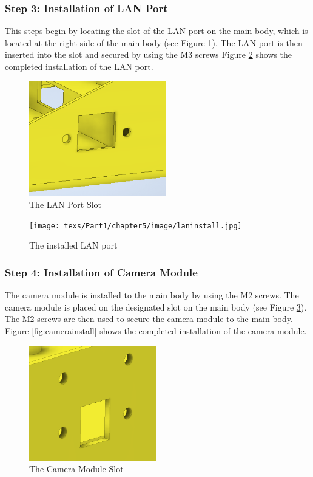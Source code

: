 \subsubsection{Step 3: Installation of LAN Port}

This steps begin by locating the slot of the LAN port on the main body, which is located at the right side of the main body (see Figure \ref{fig:lanslot}). The LAN port is then inserted into the slot and secured by using the M3 screws Figure \ref{fig:laninstall} shows the completed installation of the LAN port.

\begin{figure}
    \centering
    \includegraphics[height=5cm]{texs/Part1/chapter5/image/lanslot.png}
    \caption{The LAN Port Slot}
    \label{fig:lanslot}
\end{figure}

\begin{figure}
    \centering
    \texttt{[image: texs/Part1/chapter5/image/laninstall.jpg]}
    \caption{The installed LAN port}
    \label{fig:laninstall}
\end{figure}

\subsubsection{Step 4: Installation of Camera Module}

The camera module is installed to the main body by using the M2 screws. The camera module is placed on the designated slot on the main body (see Figure \ref{fig:cameraslot}). The M2 screws are then used to secure the camera module to the main body. Figure \ref{fig:camerainstall} shows the completed installation of the camera module.

\begin{figure}
    \centering
    \includegraphics[height=5cm]{texs/Part1/chapter5/image/camslot.png}
    \caption{The Camera Module Slot}
    \label{fig:cameraslot}
\end{figure}

